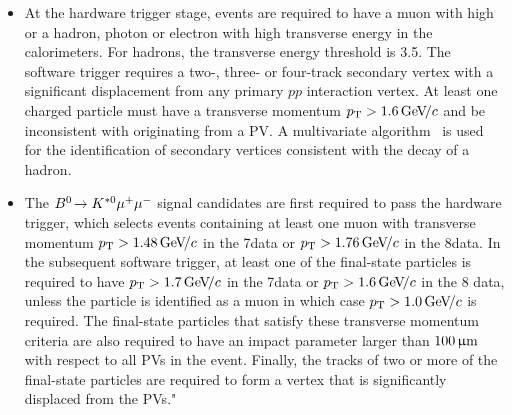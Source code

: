 \begin{itemize}
\item At the hardware trigger stage, events are required to have a muon with high \pt or a
  hadron, photon or electron with high transverse energy in the calorimeters. For hadrons,
  the transverse energy threshold is 3.5\gev.
  The software trigger requires a two-, three- or four-track
  secondary vertex with a significant displacement from any primary
  $pp$ interaction vertex. At least one charged particle
  must have a transverse momentum $p_{\mathrm{ T}} > 1.6{\mathrm{\,Ge\kern -0.1em V\!/}c}$ and be
  inconsistent with originating from a PV.
  A multivariate algorithm~\cite{BBDT} is used for
  the identification of secondary vertices consistent with the decay
  of a \bquark hadron.
\item The $\mbox{\ensuremath{{{B}^0}\!\rightarrow {\ensuremath{{K}^{*0}}}{\ensuremath{\mu^+\mu^-}}}}$ signal candidates are first required
      to pass the hardware trigger, which selects events containing at least
      one muon with transverse momentum $p_{\mathrm{ T}}>1.48{\mathrm{\,Ge\kern -0.1em V\!/}c}$ in the 7\tev data or
      $p_{\mathrm{ T}}>1.76{\mathrm{\,Ge\kern -0.1em V\!/}c}$ in the 8\tev data.  In the subsequent software
      trigger, at least one of the final-state particles is required to 
      have $p_{\mathrm{ T}}>1.7{\mathrm{\,Ge\kern -0.1em V\!/}c}$ in the 7\tev data or $p_{\mathrm{ T}}>1.6{\mathrm{\,Ge\kern -0.1em V\!/}c}$ in the 8\tev 
      data, unless the particle is identified as a muon in which case 
      $p_{\mathrm{ T}}>1.0{\mathrm{\,Ge\kern -0.1em V\!/}c}$ is required. The final-state particles that 
      satisfy these transverse momentum criteria are also required 
      to have an impact parameter larger than $100{\,\upmu\mathrm{m}}$ with respect 
      to all PVs in the event. Finally, the tracks of two or more of 
      the final-state particles are required to form a vertex that is 
      significantly displaced from the PVs." 

\end{itemize}

